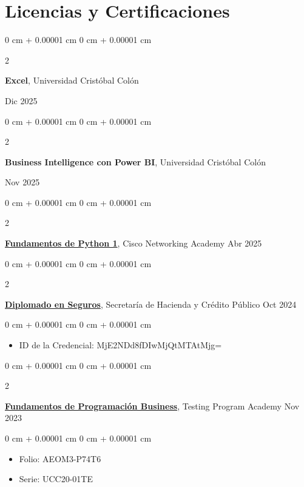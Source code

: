 \documentclass[10pt, letterpaper]{article}
\newenvironment{highlights}{
    \begin{itemize}[
        topsep=0.10 cm,
        parsep=0.10 cm,
        partopsep=0pt,
        itemsep=0pt,
        leftmargin=0 cm + 10pt
    ]
}{
    \end{itemize}
} %
\newenvironment{onecolentry}{
    \begin{adjustwidth}{
        0 cm + 0.00001 cm
    }{
        0 cm + 0.00001 cm
    }
}{
    \end{adjustwidth}
} %
\newenvironment{twocolentry}[2][]{
    \onecolentry
    \def\secondColumn{#2}
    \setcolumnwidth{\fill, 4.5 cm}
    \begin{paracol}{2}
}{
    \switchcolumn \raggedleft \secondColumn
    \end{paracol}
    \endonecolentry
} %
\begin{document}
 \section{Licencias y Certificaciones}
		
		 \begin{twocolentry}{
				Dic 2025
			}
			\textbf{Excel}, Universidad Cristóbal Colón
		\end{twocolentry}
		
        \begin{twocolentry}{
        	Nov 2025
       	}
       		\textbf{Business Intelligence con Power BI}, Universidad Cristóbal Colón
        \end{twocolentry}
        
        \begin{twocolentry}{
            Abr 2025
        }
            \href{https://www.credly.com/badges/bcacb0c9-c50e-44ce-a68c-ddd050b1626e/public_url}{\textbf{Fundamentos de Python 1}}, Cisco Networking Academy \end{twocolentry}

        \vspace{0.10 cm}
        
        \begin{twocolentry}{
            Oct 2024
        }
            \href{https://diplomadoenseguros.condusef.gob.mx/qr_verifica.php?ida=21647&idg=3}{\textbf{Diplomado en Seguros}}, Secretaría de Hacienda y Crédito Público\end{twocolentry}

        \vspace{0.10 cm}
        \begin{onecolentry}
            \begin{highlights}
                \item ID de la Credencial: MjE2NDd8fDIwMjQtMTAtMjg=
            \end{highlights}
        \end{onecolentry}

        \begin{twocolentry}{
            Nov 2023
        }
            \href{https://testingprogram.com.mx/validar/}{\textbf{Fundamentos de Programación Business}}, Testing Program Academy\end{twocolentry}

        \vspace{0.10 cm}
        \begin{onecolentry}
            \begin{highlights}
                \item Folio: AEOM3-P74T6
                \item Serie: UCC20-01TE
            \end{highlights}
        \end{onecolentry}
\end{document}
